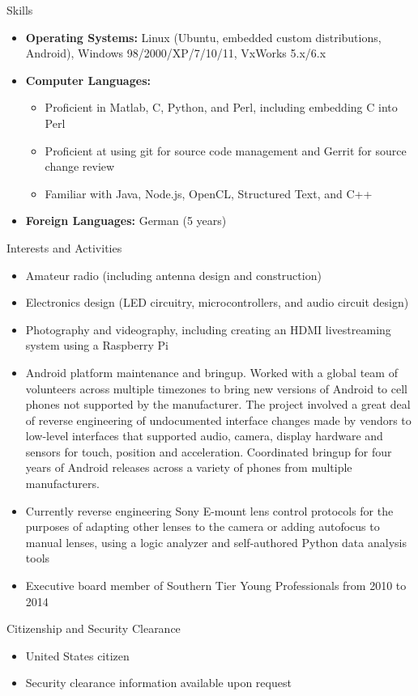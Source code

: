 \documentclass[10pt,oneside]{article}
\newenvironment{ressection}[1]{
	\vspace{4pt}
	{\Large#1}
	\begin{itemize}
	\vspace{3pt}
}{
	\end{itemize}
}
\newcommand{\resitem}[1]{
	\vspace{-4pt}
	\item \begin{flushleft} #1 \end{flushleft}
}
\newcommand{\ressubitem}[1]{
	\vspace{-1pt}
	\item \begin{flushleft} #1 \end{flushleft}
}
\newenvironment{reslist}[1]{
	\resitem{\textbf{#1}}
	\vspace{-5pt}
	\begin{itemize}
}{
	\end{itemize}
}
\newenvironment{ressection}[1]{
	\vspace{4pt}
	{\fontfamily{phv}\selectfont\Large#1}
	\begin{itemize}[leftmargin=12pt]
	\vspace{3pt}
}{
	\end{itemize}
}
\newcommand{\resitem}[1]{
	\vspace{-4pt}
	\item \begin{flushleft} #1 \end{flushleft}
}
\newcommand{\ressubitem}[1]{
	\vspace{-1pt}
	\item \begin{flushleft} #1 \end{flushleft}
}
\newenvironment{reslist}[1]{
	\resitem{\textbf{#1}}
	\vspace{-5pt}
	\begin{itemize}[leftmargin=12pt]
}{
	\end{itemize}
}
\begin{document}
\begin{ressection}{Skills}

	\resitem{\textbf{Operating Systems:} Linux (Ubuntu, embedded custom distributions, Android), Windows 98/2000/XP/7/10/11, VxWorks 5.x/6.x}

	\begin{reslist}{\textbf{Computer Languages:}}
	  	\ressubitem{Proficient in Matlab, C, Python, and Perl, including embedding C into Perl}
        \ressubitem{Proficient at using git for source code management and Gerrit for source change review}
	  	\ressubitem{Familiar with Java, Node.js, OpenCL, Structured Text, and C++}
	\end{reslist}

	\resitem{\textbf{Foreign Languages:} German (5 years)}

\end{ressection}

\begin{ressection}{Interests and Activities}
		\resitem{Amateur radio (including antenna design and construction)}
		\resitem{Electronics design (LED circuitry, microcontrollers, and audio circuit design)}
		\resitem{Photography and videography, including creating an HDMI livestreaming system using a Raspberry Pi}
	    \resitem{Android platform maintenance and bringup.  Worked with a global team of volunteers across multiple timezones to bring new versions of Android to cell phones not supported by the manufacturer.  The project involved a great deal of reverse engineering of undocumented interface changes made by vendors to low-level interfaces that supported audio, camera, display hardware and sensors for touch, position and acceleration.  Coordinated bringup for four years of Android releases across a variety of phones from multiple manufacturers.}
        \resitem{Currently reverse engineering Sony E-mount lens control protocols for the purposes of adapting other lenses to the camera or adding autofocus to manual lenses, using a logic analyzer and self-authored Python data analysis tools}
		\resitem{Executive board member of Southern Tier Young Professionals from 2010 to 2014}
\end{ressection}

\begin{ressection}{Citizenship and Security Clearance}

	\resitem{United States citizen}

	\resitem{Security clearance information available upon request}

\end{ressection}
\end{document}
